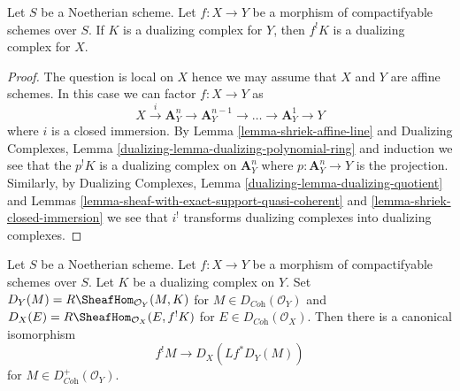 \begin{lemma}
\label{lemma-shriek-dualizing}
Let $S$ be a Noetherian scheme. Let $f : X \to Y$ be a morphism
of compactifyable schemes over $S$. If $K$ is a dualizing complex
for $Y$, then $f^!K$ is a dualizing complex for $X$.
\end{lemma}

\begin{proof}
The question is local on $X$ hence we may assume that $X$ and $Y$ are
affine schemes. In this case we can factor $f : X \to Y$ as
$$
X \xrightarrow{i} \mathbf{A}^n_Y \to \mathbf{A}^{n - 1}_Y \to \ldots \to
\mathbf{A}^1_Y \to Y
$$
where $i$ is a closed immersion. By Lemma \ref{lemma-shriek-affine-line} and
Dualizing Complexes, Lemma \ref{dualizing-lemma-dualizing-polynomial-ring}
and induction we see that
the $p^!K$ is a dualizing complex on $\mathbf{A}^n_Y$ where
$p : \mathbf{A}^n_Y \to Y$ is the projection. Similarly, by
Dualizing Complexes, Lemma \ref{dualizing-lemma-dualizing-quotient}
and Lemmas
\ref{lemma-sheaf-with-exact-support-quasi-coherent} and
\ref{lemma-shriek-closed-immersion} we see that $i^!$
transforms dualizing complexes into dualizing complexes.
\end{proof}

\begin{lemma}
\label{lemma-shriek-via-duality}
Let $S$ be a Noetherian scheme. Let $f : X \to Y$ be a morphism
of compactifyable schemes over $S$. Let $K$ be a dualizing complex
on $Y$. Set $D_Y(M) = R\SheafHom_{\mathcal{O}_Y}(M, K)$ for
$M \in D_{\textit{Coh}}(\mathcal{O}_Y)$ and
$D_X(E) = R\SheafHom_{\mathcal{O}_X}(E, f^!K)$ for
$E \in D_{\textit{Coh}}(\mathcal{O}_X)$. Then there is a canonical
isomorphism
$$
f^!M \longrightarrow D_X(Lf^*D_Y(M))
$$
for $M \in D_{\textit{Coh}}^+(\mathcal{O}_Y)$.
\end{lemma}

